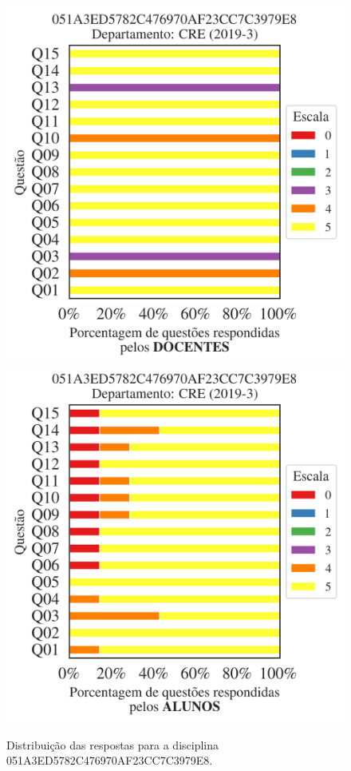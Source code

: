 \documentclass[a4paper,10pt]{article}
\begin{document}
\begin{figure}[h]
\centering
\includegraphics[width=0.485\linewidth]{analise_disciplina_departamento_CRE_051A3ED5782C476970AF23CC7C3979E8_docentes.png}
\includegraphics[width=0.485\linewidth]{analise_disciplina_departamento_CRE_051A3ED5782C476970AF23CC7C3979E8_alunos.png}
\caption{\label{fig:analise_geral_departamento}                Distribuição das respostas para a disciplina 051A3ED5782C476970AF23CC7C3979E8. }
\end{figure}
\end{document}
